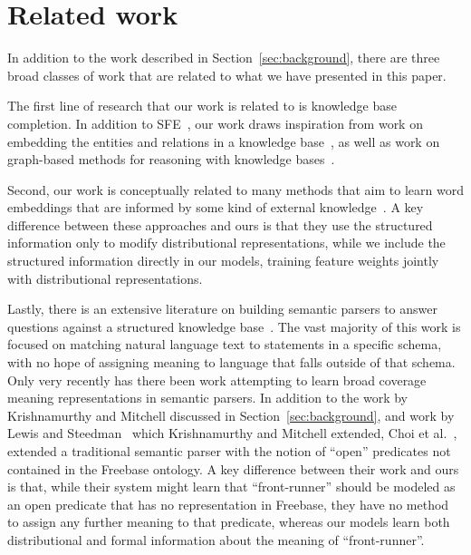 \documentclass[11pt]{article}
\newcommand{\secref}[1]{Section~\ref{sec:#1}}
\begin{document}
\section{Related work}

In addition to the work described in \secref{background}, there are
three broad classes of work that are related to what we have presented
in this paper.

The first line of research that our work is related to is knowledge
base completion.  In addition to SFE~\cite{gardner-2015-sfe}, our work
draws inspiration from work on embedding the entities and relations in
a knowledge base~\cite{riedel-2013-mf-universal-schema,%
nickel-2011-rescal,bordes-2013-transe,nickel-2014-are,%
toutanova-2015-joint-text-kb-embedding}, as well as work on
graph-based methods for reasoning with knowledge
bases~\cite{lao-2010-original-pra,gardner-2014-vector-space-pra,%
neelakantan-2015-rnn-kbc}.

Second, our work is conceptually related to many methods that aim to
learn word embeddings that are informed by some kind of external
knowledge~\cite{faruqui-2015-retrofitting-word-vectors,%
rocktaschel-2015-logical-embeddings,schwartz-2016-symmetric-patterns-w2v,%
yu-2014-w2v-with-semantic-knowledge}.  A key difference between these
approaches and ours is that they use the structured information only
to modify distributional representations, while we include the
structured information directly in our models, training feature
weights jointly with distributional representations.

Lastly, there is an extensive literature on building semantic parsers
to answer questions against a structured knowledge
base~\cite{zettlemoyer-2005-ccg,berant-2013-semantic-parsing-qa,%
kwiatkowski-2013-ontology-matching,krishnamurthy-2012-semantic-parsing,%
li-2015-semantic-parsing-scfg}.  The vast majority of this work is
focused on matching natural language text to statements in a specific
schema, with no hope of assigning meaning to language that falls
outside of that schema.  Only very recently has there been work
attempting to learn broad coverage meaning representations in semantic
parsers.  In addition to the work by Krishnamurthy and Mitchell
discussed in \secref{background}, and work by Lewis and
Steedman~
which Krishnamurthy and Mitchell extended, Choi et
al.~,
extended a traditional semantic parser with the notion of ``open''
predicates not contained in the Freebase ontology.  A key difference
between their work and ours is that, while their system might learn
that ``front-runner'' should be modeled as an open predicate that has
no representation in Freebase, they have no method to assign any
further meaning to that predicate, whereas our models learn both
distributional and formal information about the meaning of
``front-runner''.
\end{document}
